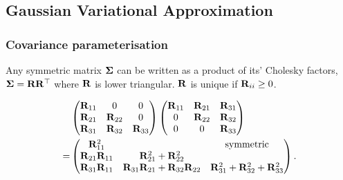 \documentclass[times, doublespace]{anzsauth}
\begin{document}
	\subsection{Gaussian Variational Approximation}
		
		
	\subsubsection{Covariance parameterisation}
		
	\noindent Any symmetric matrix ${\boldsymbol \Sigma}$ can be written as a product of its' Cholesky factors, ${\boldsymbol \Sigma} =
	{\bf R} {\bf R}^\top$   where ${\bf R}$ is lower triangular. ${\bf R}$ is unique if ${\bf R}_{ii} \geq 0$.
	
	\begin{align*}
		&\begin{pmatrix}
		{\bf R}_{11}          & 0                                    & 0                                     \\
		{\bf R}_{21}          & {\bf R}_{22}                             & 0                                     \\
		{\bf R}_{31}          & {\bf R}_{32}                             & {\bf R}_{33}                              
		\end{pmatrix}
		\begin{pmatrix}
		{\bf R}_{11}          & {\bf R}_{21}                             & {\bf R}_{31}                              \\
		0                 & {\bf R}_{22}                             & {\bf R}_{32}                              \\
		0                 & 0                                    & {\bf R}_{33}                              
		\end{pmatrix}
		\\
		=& \begin{pmatrix}
		{\bf R}_{11}^2        &                                      & \text{symmetric}                      \\
		{\bf R}_{21}{\bf R}_{11} & {\bf R}_{21}^2 + {\bf R}_{22}^2 \\
		{\bf R}_{31} {\bf R}_{11} & {\bf R}_{31}{\bf R}_{21} + {\bf R}_{32} {\bf R}_{22} & {\bf R}_{31}^2 + {\bf R}_{32} ^2 + {\bf R}_{33}^2 
		\end{pmatrix}.
	\end{align*}
	
	
\end{document}
